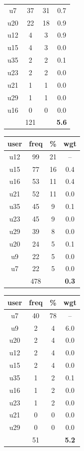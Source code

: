 \begin{table}
\begin{tabular}{ |c|c|c|c| }
	u7 & 37 & 31 & 0.7 \\
	u20 & 22 & 18 & 0.9 \\
	u12 & 4 & 3 & 0.9 \\
	u15 & 4 & 3 & 0.0 \\
	u35 & 2 & 2 & 0.1 \\
	u23 & 2 & 2 & 0.0 \\
	u21 & 1 & 1 & 0.0 \\
	u29 & 1 & 1 & 0.0 \\
	u16 & 0 & 0 & 0.0 \\
	 & 121 & & \textbf{5.6} \\
	\hline
\end{tabular}
\begin{tabular}{ |c|c|c|c| }
	\hline
	\textbf{user} & \textbf{freq} & \textbf{\%} & \textbf{wgt} \\
	\hline
	u12 & 99 & 21 & -- \\
	u15 & 77 & 16 & 0.4 \\
	u16 & 53 & 11 & 0.4 \\
	u21 & 52 & 11 & 0.0 \\
	u35 & 45 & 9 & 0.1 \\
	u23 & 45 & 9 & 0.0 \\
	u29 & 39 & 8 & 0.0 \\
	u20 & 24 & 5 & 0.1 \\
	u9 & 22 & 5 & 0.0 \\
	u7 & 22 & 5 & 0.0 \\
	 & 478 & & \textbf{0.3} \\
	\hline
\end{tabular}
\begin{tabular}{ |c|c|c|c| }
	\hline
	\textbf{user} & \textbf{freq} & \textbf{\%} & \textbf{wgt} \\
	\hline
	u7 & 40 & 78 & -- \\
	u9 & 2 & 4 & 6.0 \\
	u20 & 2 & 4 & 0.0 \\
	u12 & 2 & 4 & 0.0 \\
	u15 & 2 & 4 & 0.0 \\
	u35 & 1 & 2 & 0.1 \\
	u16 & 1 & 2 & 0.0 \\
	u23 & 1 & 2 & 0.0 \\
	u21 & 0 & 0 & 0.0 \\
	u29 & 0 & 0 & 0.0 \\
	 & 51 & & \textbf{5.2} \\
	\hline

\end{tabular}
\end{table}
